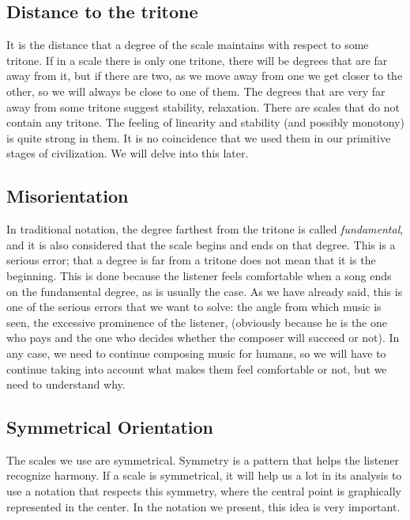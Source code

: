 \documentclass[]{report}
\begin{document}
\subsection{Distance to the tritone}
It is the distance that a degree of the scale maintains with respect to some tritone. If in a scale there is only one tritone, there will be degrees that are far away from it, but if there are two, as we move away from one we get closer to the other, so we will always be close to one of them.
The degrees that are very far away from some tritone suggest stability, relaxation. There are scales that do not contain any tritone. The feeling of linearity and stability (and possibly monotony) is quite strong in them. It is no coincidence that we used them in our primitive stages of civilization. We will delve into this later.
\subsection{Misorientation}
In traditional notation, the degree farthest from the tritone is called \emph{fundamental}, and it is also considered that the scale begins and ends on that degree. This is a serious error; that a degree is far from a tritone does not mean that it is the beginning. This is done because the listener feels comfortable when a song ends on the fundamental degree, as is usually the case. As we have already said, this is one of the serious errors that we want to solve: the angle from which music is seen, the excessive prominence of the listener, (obviously because he is the one who pays and the one who decides whether the composer will succeed or not). In any case, we need to continue composing music for humans, so we will have to continue taking into account what makes them feel comfortable or not, but we need to understand why.
\subsection{Symmetrical Orientation}
The scales we use are symmetrical. Symmetry is a pattern that helps the listener recognize harmony. If a scale is symmetrical, it will help us a lot in its analysis to use a notation that respects this symmetry, where the central point is graphically represented in the center. In the notation we present, this idea is very important.
\end{document}
